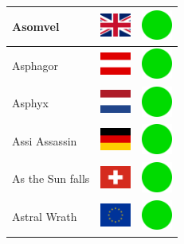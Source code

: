 \documentclass[12pt, a4paper, twoside]{report}
\begin{document}
\begin{center}
\begin{longtable}{|p{5cm}|p{2cm}|p{2cm}|}
 Asomvel                                                    & \includegraphics[width=1cm]{../4x3/gb} &   \includegraphics[width=1cm]{../likes/y} \\ \hline
 Asphagor                                                   & \includegraphics[width=1cm]{../4x3/at} &   \includegraphics[width=1cm]{../likes/y} \\ \hline
 Asphyx                                                     & \includegraphics[width=1cm]{../4x3/nl} &   \includegraphics[width=1cm]{../likes/y} \\ \hline
 Assi Assassin                                              & \includegraphics[width=1cm]{../4x3/de} &   \includegraphics[width=1cm]{../likes/y} \\ \hline
 As the Sun falls                                           & \includegraphics[width=1cm]{../4x3/ch} &   \includegraphics[width=1cm]{../likes/y} \\ \hline
 Astral Wrath                                               & \includegraphics[width=1cm]{../4x3/eu} &   \includegraphics[width=1cm]{../likes/y} \\ \hline

\end{longtable}
\end{center}
\end{document}
